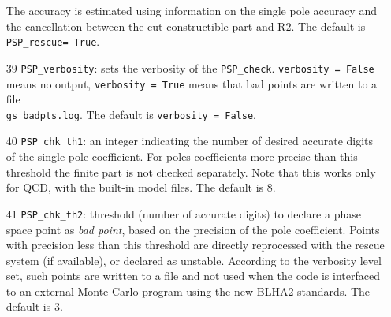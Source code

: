 \documentclass[11pt,a4paper]{refrep}
\begin{document}
\begin{enumerate}
    The accuracy is estimated using information on the single       
    pole accuracy and the cancellation between the cut-constructible    
    part and R2.                                                    
The default is \texttt{PSP\_rescue= True}. 
\item[39] \texttt{PSP\_verbosity}:     sets the verbosity of the {\tt PSP\_check}. 
{\tt verbosity = False} means no output,                                     
{\tt verbosity = True} means that bad points are written to a file \\{\tt gs\_badpts.log}.
 The default is {\tt verbosity = False}.
\item[40] \texttt{PSP\_chk\_th1}: an integer indicating the  number of desired accurate digits
of the single pole coefficient. For poles coefficients more precise than this
threshold the finite part is not checked separately.
Note that this works only for QCD, with the built-in model files.    
The default is 8. 
\item[41] \texttt{PSP\_chk\_th2}: threshold (number of accurate digits) to declare a 
phase space point  as {\it bad point}, based on the precision of the pole coefficient.
Points with precision less than this threshold are directly reprocessed with 
    the rescue system (if available), or declared as unstable. According to the
    verbosity level set, such points are written to a file and not used when
    the code is interfaced to an external Monte Carlo program using the new BLHA2 standards.
The default is 3. 


\end{enumerate}
\end{document}
